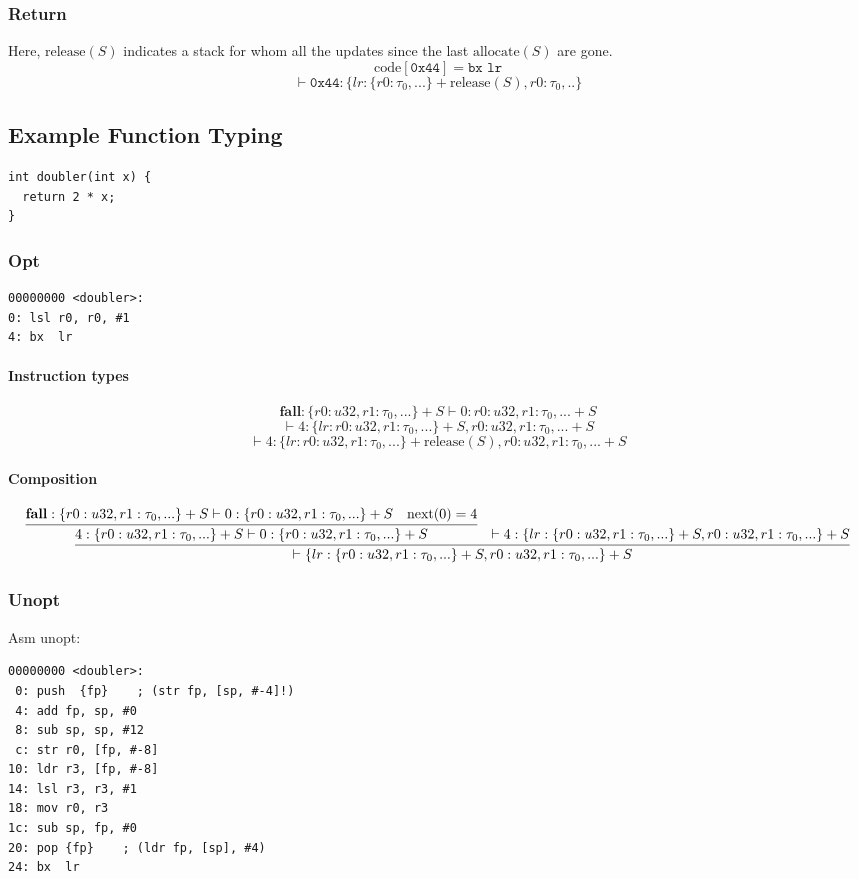 \documentclass{article}
\begin{document}
\subsubsection{Return}
Here, $\mathrm{release}(S)$ indicates a stack for whom all the updates since the last $\mathrm{allocate}(S)$ are gone.
\[\mathrm{code} [ \texttt{0x44} ] = \texttt{bx lr}\]
\[\vdash \texttt{0x44} : \{lr : \{r0 : \tau_0, ...\}+\mathrm{release}(S), r0 : \tau_0, ..\}\]

\subsection{Example Function Typing}

\begin{lstlisting}
int doubler(int x) {
  return 2 * x;
}
\end{lstlisting}

\subsubsection{Opt}
\begin{lstlisting}
00000000 <doubler>:
0: lsl r0, r0, #1
4: bx  lr
\end{lstlisting}
\paragraph{Instruction types}
\[\mathbf{fall} : \{r0 : u32, r1 : \tau_0, ...\}+S \vdash 0: {r0 : u32, r1 : \tau_0, ...}+S\]
\[\vdash 4: \{lr : {r0 : u32, r1 : \tau_0, ...\}+S, r0 : u32, r1 : \tau_0, ...}+S\]
\[\vdash 4: \{lr : {r0 : u32, r1 : \tau_0, ...\}+\mathrm{release}(S), r0 : u32, r1 : \tau_0, ...}+S\]
\paragraph{Composition}
\begin{turn}{-90}
  \begin{minipage}{\textheight}
\[\infer{\vdash \{lr : \{r0 : u32, r1 : \tau_0, ...\}+S, r0 : u32, r1 : \tau_0, ...\}+S}
        {\infer{\mathrm{4} : \{r0 : u32, r1 : \tau_0, ...\}+S \vdash 0: \{r0 : u32, r1 : \tau_0, ...\}+S}
               {\mathbf{fall} : \{r0 : u32, r1 : \tau_0, ...\}+S \vdash 0: \{r0 : u32, r1 : \tau_0, ...\}+S & \mathrm{next}(0) = 4}
         & \vdash 4: \{lr : \{r0 : u32, r1 : \tau_0, ...\}+S, r0 : u32, r1 : \tau_0, ...\}+S}
\]
  \end{minipage}
\end{turn}
\subsubsection{Unopt}
Asm unopt:
\begin{lstlisting}
00000000 <doubler>:
 0: push  {fp}    ; (str fp, [sp, #-4]!)
 4: add fp, sp, #0
 8: sub sp, sp, #12
 c: str r0, [fp, #-8]
10: ldr r3, [fp, #-8]
14: lsl r3, r3, #1
18: mov r0, r3
1c: sub sp, fp, #0
20: pop {fp}    ; (ldr fp, [sp], #4)
24: bx  lr
\end{lstlisting}
\end{document}
